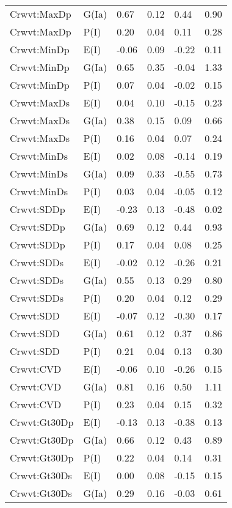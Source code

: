 \begin{center}
\begin{longtable}{|p{1.1in}|p{0.7in}|p{0.7in}|p{0.6in}|p{0.6in}|p{0.6in}|}
  Crwvt:MaxDp & G(Ia) & 0.67 & 0.12 & 0.44 & 0.90 \\ 
  Crwvt:MaxDp & P(I) & 0.20 & 0.04 & 0.11 & 0.28 \\ 
  Crwvt:MinDp & E(I) & -0.06 & 0.09 & -0.22 & 0.11 \\ 
  Crwvt:MinDp & G(Ia) & 0.65 & 0.35 & -0.04 & 1.33 \\ 
  Crwvt:MinDp & P(I) & 0.07 & 0.04 & -0.02 & 0.15 \\ 
  Crwvt:MaxDs & E(I) & 0.04 & 0.10 & -0.15 & 0.23 \\ 
  Crwvt:MaxDs & G(Ia) & 0.38 & 0.15 & 0.09 & 0.66 \\ 
  Crwvt:MaxDs & P(I) & 0.16 & 0.04 & 0.07 & 0.24 \\ 
  Crwvt:MinDs & E(I) & 0.02 & 0.08 & -0.14 & 0.19 \\ 
  Crwvt:MinDs & G(Ia) & 0.09 & 0.33 & -0.55 & 0.73 \\ 
  Crwvt:MinDs & P(I) & 0.03 & 0.04 & -0.05 & 0.12 \\ 
  Crwvt:SDDp & E(I) & -0.23 & 0.13 & -0.48 & 0.02 \\ 
  Crwvt:SDDp & G(Ia) & 0.69 & 0.12 & 0.44 & 0.93 \\ 
  Crwvt:SDDp & P(I) & 0.17 & 0.04 & 0.08 & 0.25 \\ 
  Crwvt:SDDs & E(I) & -0.02 & 0.12 & -0.26 & 0.21 \\ 
  Crwvt:SDDs & G(Ia) & 0.55 & 0.13 & 0.29 & 0.80 \\ 
  Crwvt:SDDs & P(I) & 0.20 & 0.04 & 0.12 & 0.29 \\ 
  Crwvt:SDD & E(I) & -0.07 & 0.12 & -0.30 & 0.17 \\ 
  Crwvt:SDD & G(Ia) & 0.61 & 0.12 & 0.37 & 0.86 \\ 
  Crwvt:SDD & P(I) & 0.21 & 0.04 & 0.13 & 0.30 \\ 
  Crwvt:CVD & E(I) & -0.06 & 0.10 & -0.26 & 0.15 \\ 
  Crwvt:CVD & G(Ia) & 0.81 & 0.16 & 0.50 & 1.11 \\ 
  Crwvt:CVD & P(I) & 0.23 & 0.04 & 0.15 & 0.32 \\ 
  Crwvt:Gt30Dp & E(I) & -0.13 & 0.13 & -0.38 & 0.13 \\ 
  Crwvt:Gt30Dp & G(Ia) & 0.66 & 0.12 & 0.43 & 0.89 \\ 
  Crwvt:Gt30Dp & P(I) & 0.22 & 0.04 & 0.14 & 0.31 \\ 
  Crwvt:Gt30Ds & E(I) & 0.00 & 0.08 & -0.15 & 0.15 \\ 
  Crwvt:Gt30Ds & G(Ia) & 0.29 & 0.16 & -0.03 & 0.61 \\ 

\end{longtable}
\end{center}
